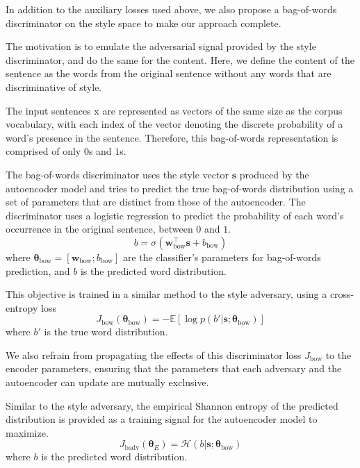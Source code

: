 \documentclass[letterpaper]{article} %
\newcommand{\rmx}{\mathrm x}
\newcommand{\loss}[1]{J_\text{#1}}
\begin{document}
In addition to the auxiliary losses used above, we also propose a bag-of-words discriminator on the style space to make our approach complete.

The motivation is to emulate the adversarial signal provided by the style discriminator, and do the same for the content. Here, we define the content of the sentence as the words from the original sentence without any words that are discriminative of style.

The input sentences $\rmx$ are represented as vectors of the same size as the corpus vocabulary, with each index of the vector denoting the discrete probability of a word's presence in the sentence. Therefore, this bag-of-words representation is comprised of only $0$s and $1$s.

The bag-of-words discriminator uses the style vector $\bm s$ produced by the autoencoder model and tries to predict the true bag-of-words distribution using a set of parameters that are distinct from those of the autoencoder. The discriminator uses a logistic regression to predict the probability of each word's occurrence in the original sentence, between $0$ and $1$.
\begin{equation}
	b = \sigma(\bm w_\text{bow}^\top \bm s + b_\text{bow})
\end{equation}
where $\bm\theta_\text{bow}=[\bm w_\text{bow}; b_\text{bow}]$ are the classifier's parameters for bag-of-words prediction, and $b$ is the predicted word distribution.

This objective is trained in a similar method to the style adversary, using a cross-entropy loss
\begin{equation} \label{eqn:adv-bow-disc-loss}
	\loss{bow}(\bm\theta_\text{bow}) =
	- \mathbb{E} [\log p(b' | \bm s; \bm\theta_\text{bow})]
\end{equation}
where $b'$ is the true word distribution.

We also refrain from propagating the effects of this discriminator loss $\loss{bow}$ to the encoder parameters, ensuring that the parameters that each adversary and the autoencoder can update are mutually exclusive.

Similar to the style adversary, the empirical Shannon entropy of the predicted distribution is provided as a training signal for the autoencoder model to maximize.
\begin{equation}
	\loss{badv}(\bm\theta_E) = \mathcal{H}(b | \bm s; \bm\theta_\text{bow})
\end{equation}
where $b$ is the predicted word distribution.
\end{document}
